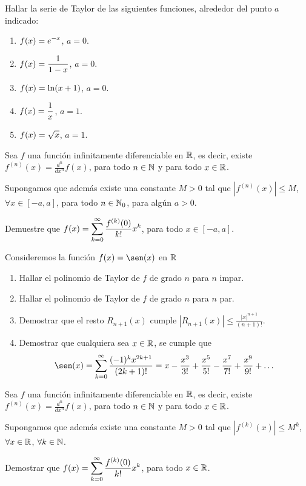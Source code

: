 \item Hallar la serie de Taylor de las siguientes funciones, alrededor del punto $a$ indicado:
\begin{multicols}{2}
  \begin{enumerate}
    \item $\displaystyle f(x) = e^{-x}$, $a = 0$.
    \item $\displaystyle f(x) = \frac1{1-x}$, $a = 0$.
    \item $\displaystyle f(x) = \ln (x+1)$, $a = 0$.
    \item $\displaystyle f(x) = \frac1x$, $a = 1$.
    \item $\displaystyle f(x) = \sqrt{x}$, $a = 1$.
  \end{enumerate}
  
\end{multicols}

\item Sea $f$ una función infinitamente diferenciable en $\mathbb{R}$, es decir, existe $f^{(n)}(x) = \frac{d^n}{dx^n}f(x)$, para todo $n\in 
\mathbb{N}$ y para todo $x\in \mathbb{R}$. 

Supongamos que además existe una constante $M>0$ tal que $|f^{(n)}(x)| \le M$, $\forall x\in [-a,a]$, para todo $n\in\mathbb{N}_0$, para algún $a>0$.

Demuestre que 
$\displaystyle f(x) = \sum_{k=0}^\infty \frac{f^{(k)}(0)}{k!}x^k$, para todo $x\in [-a,a]$.

\item Consideremos la función $f(x)=\sen(x)$ en $\mathbb{R}$

\begin{enumerate}
\item Hallar el polinomio de Taylor de $f$ de grado $n$ para $n$ impar.

\item Hallar el polinomio de Taylor de $f$ de grado $n$ para $n$ par.

\item Demostrar que el resto $R_{n+1}(x)$ cumple $|R_{n+1}(x)| \le \frac{|x|^{n+1}}{(n+1)!}$.

\item  Demostrar que cualquiera sea $x \in \mathbb{R}$, se cumple que
\[ 
\sen(x) = \sum_{k=0}^\infty \frac{(-1)^k x^{2k+1} }{(2k+1)!}  
= x - \frac{x^3}{3!} + \frac{x^5}{5!} - \frac{x^7}{7!} + \frac{x^9}{9!} + \dots
\]
\end{enumerate}

\item Sea $f$ una función infinitamente diferenciable en $\mathbb{R}$, es decir, existe $f^{(n)}(x) = \frac{d^n}{dx^n}f(x)$, para todo $n\in 
\mathbb{N}$ y para todo $x\in \mathbb{R}$. 

Supongamos que además existe una constante $M>0$ tal que $|f^{(k)}(x)| \le M^k$, $\forall x\in \mathbb{R}$, $\forall k \in \mathbb{N}$.

Demostrar que 
$\displaystyle f(x) = \sum_{k=0}^\infty \frac{f^{(k)}(0)}{k!}x^k$, para todo $x\in \mathbb{R}$.